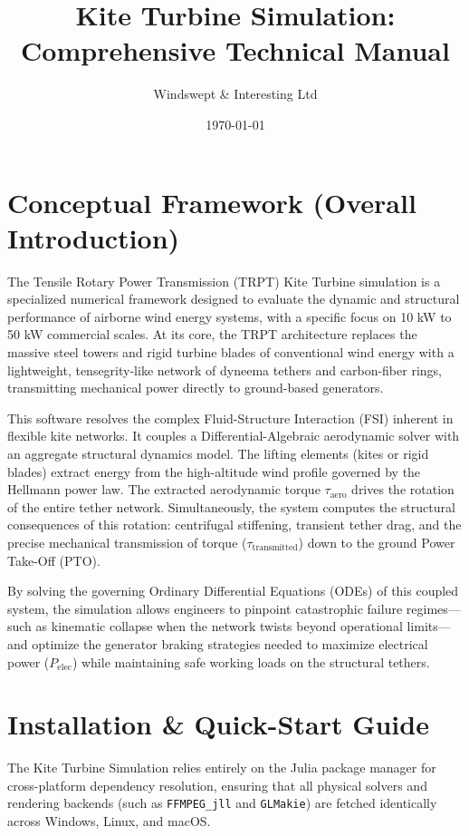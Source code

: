 \documentclass[11pt,a4paper]{article}
\title{\textbf{Kite Turbine Simulation: Comprehensive Technical Manual}}
\author{Windswept \& Interesting Ltd}
\date{\today}
\begin{document}
\maketitle
\tableofcontents
\newpage

\section{Conceptual Framework (Overall Introduction)}

The Tensile Rotary Power Transmission (TRPT) Kite Turbine simulation is a specialized numerical framework designed to evaluate the dynamic and structural performance of airborne wind energy systems, with a specific focus on 10 kW to 50 kW commercial scales. At its core, the TRPT architecture replaces the massive steel towers and rigid turbine blades of conventional wind energy with a lightweight, tensegrity-like network of dyneema tethers and carbon-fiber rings, transmitting mechanical power directly to ground-based generators.

This software resolves the complex Fluid-Structure Interaction (FSI) inherent in flexible kite networks. It couples a Differential-Algebraic aerodynamic solver with an aggregate structural dynamics model. The lifting elements (kites or rigid blades) extract energy from the high-altitude wind profile governed by the Hellmann power law. The extracted aerodynamic torque $\tau_{\text{aero}}$ drives the rotation of the entire tether network. Simultaneously, the system computes the structural consequences of this rotation: centrifugal stiffening, transient tether drag, and the precise mechanical transmission of torque ($\tau_{\text{transmitted}}$) down to the ground Power Take-Off (PTO).

By solving the governing Ordinary Differential Equations (ODEs) of this coupled system, the simulation allows engineers to pinpoint catastrophic failure regimes—such as kinematic collapse when the network twists beyond operational limits—and optimize the generator braking strategies needed to maximize electrical power ($P_{\text{elec}}$) while maintaining safe working loads on the structural tethers.

\section{Installation \& Quick-Start Guide}

The Kite Turbine Simulation relies entirely on the Julia package manager for cross-platform dependency resolution, ensuring that all physical solvers and rendering backends (such as \texttt{FFMPEG\_jll} and \texttt{GLMakie}) are fetched identically across Windows, Linux, and macOS.
\end{document}
